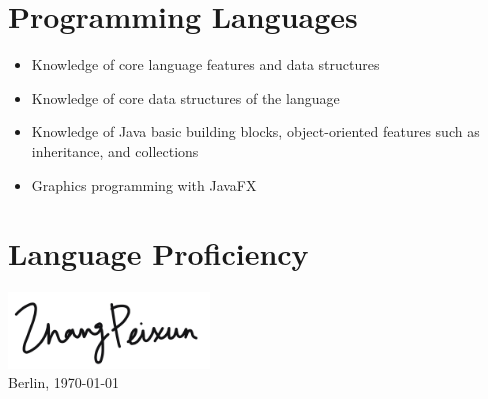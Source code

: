\documentclass[10pt,a4paper,sans]{moderncv}
\begin{document}
\section{Programming Languages}
 {
  \begin{itemize}
    \item Knowledge of core language features and data structures
  \end{itemize}
}
 {
  \begin{itemize}
      \item Knowledge of core data structures of the language
  \end{itemize}
}
 {
  \begin{itemize}
    \item Knowledge of Java basic building blocks, object-oriented features such as inheritance, and collections
    \item Graphics programming with JavaFX
  \end{itemize}
}

\section{Language Proficiency}

\emptysection{}\closesection
\vfill
\vspace{-0.85cm}
\begin{flushright}
  \includegraphics[width=0.4\textwidth]{signature}
  ~\\
  Berlin, \today
\end{flushright}
\end{document}
